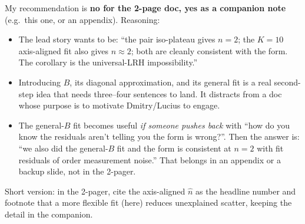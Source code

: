 \documentclass[11pt]{article}
\begin{document}
My recommendation is \textbf{no for the 2-page doc, yes as a companion note} (e.g.\ this one, or an appendix). Reasoning:
\begin{itemize}
  \item The lead story wants to be: ``the pair iso-plateau gives $n=2$; the $K{=}10$ axis-aligned fit also gives $n\approx 2$; both are cleanly consistent with the form. The corollary is the universal-LRH impossibility.''
  \item Introducing $B$, its diagonal approximation, and its general fit is a real second-step idea that needs three--four sentences to land. It distracts from a doc whose purpose is to motivate Dmitry/Lucius to engage.
  \item The general-$B$ fit becomes useful \emph{if someone pushes back} with ``how do you know the residuals aren't telling you the form is wrong?''. Then the answer is: ``we also did the general-$B$ fit and the form is consistent at $n=2$ with fit residuals of order measurement noise.'' That belongs in an appendix or a backup slide, not in the 2-pager.
\end{itemize}

Short version: in the 2-pager, cite the axis-aligned $\hat n$ as the headline number and footnote that a more flexible fit (here) reduces unexplained scatter, keeping the detail in the companion.
\end{document}
